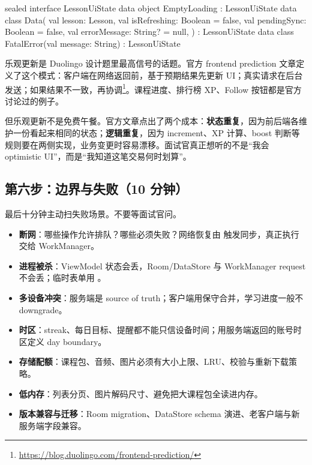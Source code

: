\begin{kotlin}
sealed interface LessonUiState {
    data object EmptyLoading : LessonUiState
    data class Data(
        val lesson: Lesson,
        val isRefreshing: Boolean = false,
        val pendingSync: Boolean = false,
        val errorMessage: String? = null,
    ) : LessonUiState
    data class FatalError(val message: String) : LessonUiState
}
\end{kotlin}

乐观更新是 Duolingo 设计题里最高信号的话题。\srcofficial 官方 frontend prediction 文章定义了这个模式：客户端在网络返回前，基于预期结果先更新 UI；真实请求在后台发送；如果结果不一致，再协调\footnote{\url{https://blog.duolingo.com/frontend-prediction/}}。课程进度、排行榜 XP、Follow 按钮都是官方讨论过的例子。

但乐观更新不是免费午餐。官方文章点出了两个成本：\textbf{状态重复}，因为前后端各维护一份看起来相同的状态；\textbf{逻辑重复}，因为 increment、XP 计算、boost 判断等规则要在两侧实现，业务变更时容易漂移。面试官真正想听的不是“我会 optimistic UI”，而是“我知道这笔交易何时划算”。

\subsection{第六步：边界与失败（10 分钟）}

最后十分钟主动扫失败场景。不要等面试官问。

\begin{itemize}
  \item \textbf{断网}：哪些操作允许排队？哪些必须失败？网络恢复由  触发同步，真正执行交给 WorkManager。
  \item \textbf{进程被杀}：ViewModel 状态会丢，Room/DataStore 与 WorkManager request 不会丢；临时表单用 。
  \item \textbf{多设备冲突}：服务端是 source of truth；客户端用保守合并，学习进度一般不 downgrade。
  \item \textbf{时区}：streak、每日目标、提醒都不能只信设备时间；用服务端返回的账号时区定义 day boundary。
  \item \textbf{存储配额}：课程包、音频、图片必须有大小上限、LRU、校验与重新下载策略。
  \item \textbf{低内存}：列表分页、图片解码尺寸、避免把大课程包全读进内存。
  \item \textbf{版本兼容与迁移}：Room migration、DataStore schema 演进、老客户端与新服务端字段兼容。
\end{itemize}


